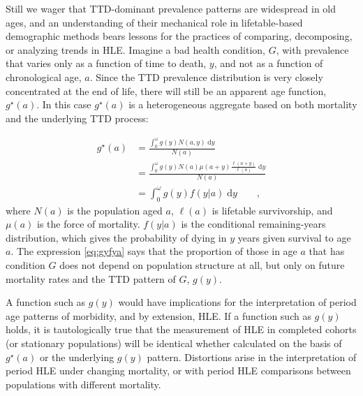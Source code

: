 \documentclass[12pt,oneside,letterpaper,doublespacing]{article}  %
\newcommand{\dd}{\; \mathrm{d}}
\newcommand{\tc}{\quad\quad\text{,}}
\begin{document}
 \FloatBarrier

Still we wager that TTD-dominant prevalence patterns are widespread in old ages, and an understanding of their mechanical role in lifetable-based demographic methods bears lessons for the practices of comparing, decomposing, or analyzing trends in HLE. 
Imagine a bad health condition, $G$, with prevalence that varies only as a
function of time to death, $y$, and not as a function of chronological age, $a$.
Since the TTD prevalence distribution is very closely concentrated at the end of life, there will still be an apparent age function,
$g^\star(a)$.
In this case $g^\star(a)$ is a heterogeneous aggregate based on both mortality
and the underlying TTD process:
 
\begin{align}
g^\star(a) &= \frac{\int _0^\omega g(y) N(a,y) \dd y}{N(a)} \\
      &= \frac{\int _0^\omega g(y) N(a)
      \mu(a+y)\frac{\ell(a+y)}{\ell(a)}\dd y}{N(a)}\\
      &= \int _0^\omega g(y) f(y|a)\dd y \label{eq:gyfya}\tc
\end{align}
where $N(a)$ is the population aged $a$, $\ell(a)$ is lifetable survivorship, and
$\mu(a)$ is the force of mortality. $f(y|a)$ is the conditional remaining-years
distribution, which gives the probability of dying in $y$ years given survival
to age $a$. The expression \eqref{eq:gyfya} says that the proportion of those in
age $a$ that has condition $G$ does not depend on population structure at all, but only on future mortality rates and the TTD pattern of $G$, $g(y)$. 

A function such as $g(y)$ would have implications for the interpretation of
period age patterns of morbidity, and by extension, HLE. If a function such as $g(y)$ holds, it is tautologically true that the
measurement of HLE in completed cohorts (or stationary populations)
will be identical whether calculated on the basis of $g^\star(a)$ or the
underlying $g(y)$ pattern. Distortions arise in the interpretation of
period HLE under changing mortality, or with period HLE comparisons between
populations with different mortality. 

\end{document}
